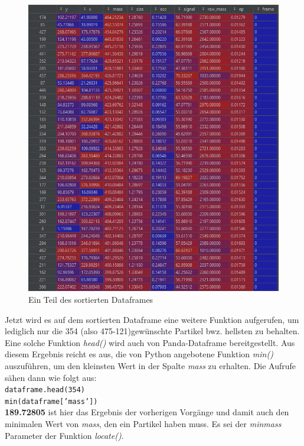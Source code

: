 \begin{enumerate}
\begin{figure}[H]
    \centering
    \includegraphics[scale=0.45]{Grafiken/trackpyBilder/df_sorted.png}
    \caption{Ein Teil des sortierten Dataframes}
    \label{fig:kap3_halbsortDataframes}
\end{figure}

Jetzt wird es auf dem sortierten Dataframe eine weitere Funktion aufgerufen, um lediglich nur die 354 (also 475-121)gewünschte Partikel bwz. hellsten zu behalten. Eine solche Funktion \textit{head()} wird auch von Panda-Dataframe bereitgestellt. Aus diesem Ergebnis reicht es aus, die von Python angebotene Funktion \textit{min()} auszuführen, um den kleinsten Wert in der Spalte \textit{mass} zu erhalten. 
Die Aufrufe sähen dann wie folgt aus:\\
\texttt{dataframe.head(354)} \\
\texttt{min(dataframe['mass'])}\\

\textbf{189.72805} ist hier das Ergebnis der vorherigen Vorgänge und damit auch den minimalen Wert von \textit{mass}, den ein Partikel haben muss. Es sei der \textit{minmass} Parameter der Funktion \textit{locate()}.




\end{enumerate}

